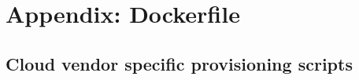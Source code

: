  
\chapter[Appendix: Dockerfile]{Appendix: Dockerfile}




\section{Cloud vendor specific provisioning scripts}



